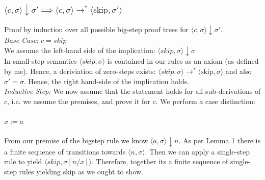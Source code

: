 \subsubsection{$\langle c, \sigma \rangle \downarrow \sigma' \implies \langle c, \sigma \rangle \rightarrow^{*} \langle \text{skip}, \sigma'\rangle$}

Proof by induction over all possible big-step proof trees for $\langle c, \sigma \rangle \downarrow \sigma' $.\\
\textit{Base Case}: $c=skip$ \\
We assume the left-hand side of the implication: $\langle skip, \sigma \rangle \downarrow \sigma$ \\
In small-step semantics $\langle skip, \sigma \rangle$ is contained in our rules as an axiom (as defined by me). Hence, a deriviation of zero-steps exists: $\langle skip, \sigma \rangle \rightarrow^{*} \langle \text{skip}, \sigma\rangle$ and also $\sigma' =\sigma$. Hence, the right hand-side of the implication holds. \\
\textit{Inductive Step:} We now assume that the statement holds for all sub-derivations of $c$, i.e. we assume the premises, and prove it for $c$. We perform a case distinction:
\paragraph{$x:=a$}
From our premise of the bigstep rule we know $\langle a,\sigma\rangle \downarrow n$. As per Lemma 1 there is a finite sequence of transitions towards $\langle n, \sigma \rangle$. Then we can apply a single-step rule to yield $\langle skip, \sigma[n/x] \rangle$. Therefore, together its a finite sequence of single-step rules yielding skip as we ought to show. 


